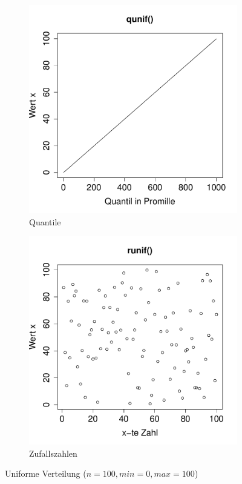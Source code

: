 \begin{figure}[h!]
\begin{subfigure}[b]{0.48\textwidth}
\includegraphics{verteilungen-041}
\caption{Quantile}
\end{subfigure}
\begin{subfigure}[b]{0.48\textwidth}
\includegraphics{verteilungen-042}
\caption{Zufallszahlen}
\end{subfigure}
\caption{Uniforme Verteilung ($n=100, min=0, max=100$)}
\label{fig:unif}
\end{figure}

